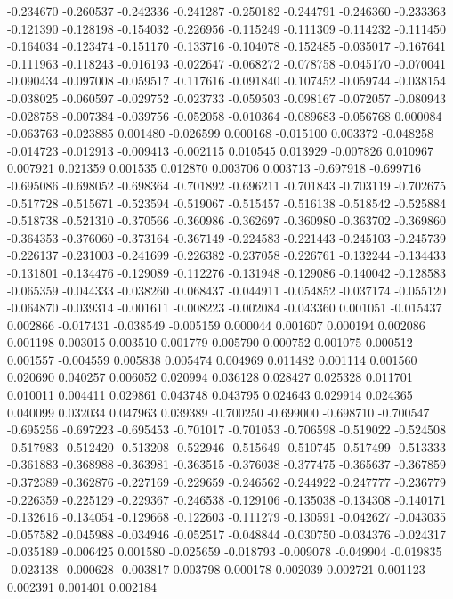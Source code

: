 -0.234670
-0.260537
-0.242336
-0.241287
-0.250182
-0.244791
-0.246360
-0.233363
-0.121390
-0.128198
-0.154032
-0.226956
-0.115249
-0.111309
-0.114232
-0.111450
-0.164034
-0.123474
-0.151170
-0.133716
-0.104078
-0.152485
-0.035017
-0.167641
-0.111963
-0.118243
-0.016193
-0.022647
-0.068272
-0.078758
-0.045170
-0.070041
-0.090434
-0.097008
-0.059517
-0.117616
-0.091840
-0.107452
-0.059744
-0.038154
-0.038025
-0.060597
-0.029752
-0.023733
-0.059503
-0.098167
-0.072057
-0.080943
-0.028758
-0.007384
-0.039756
-0.052058
-0.010364
-0.089683
-0.056768
0.000084
-0.063763
-0.023885
0.001480
-0.026599
0.000168
-0.015100
0.003372
-0.048258
-0.014723
-0.012913
-0.009413
-0.002115
0.010545
0.013929
-0.007826
0.010967
0.007921
0.021359
0.001535
0.012870
0.003706
0.003713
-0.697918
-0.699716
-0.695086
-0.698052
-0.698364
-0.701892
-0.696211
-0.701843
-0.703119
-0.702675
-0.517728
-0.515671
-0.523594
-0.519067
-0.515457
-0.516138
-0.518542
-0.525884
-0.518738
-0.521310
-0.370566
-0.360986
-0.362697
-0.360980
-0.363702
-0.369860
-0.364353
-0.376060
-0.373164
-0.367149
-0.224583
-0.221443
-0.245103
-0.245739
-0.226137
-0.231003
-0.241699
-0.226382
-0.237058
-0.226761
-0.132244
-0.134433
-0.131801
-0.134476
-0.129089
-0.112276
-0.131948
-0.129086
-0.140042
-0.128583
-0.065359
-0.044333
-0.038260
-0.068437
-0.044911
-0.054852
-0.037174
-0.055120
-0.064870
-0.039314
-0.001611
-0.008223
-0.002084
-0.043360
0.001051
-0.015437
0.002866
-0.017431
-0.038549
-0.005159
0.000044
0.001607
0.000194
0.002086
0.001198
0.003015
0.003510
0.001779
0.005790
0.000752
0.001075
0.000512
0.001557
-0.004559
0.005838
0.005474
0.004969
0.011482
0.001114
0.001560
0.020690
0.040257
0.006052
0.020994
0.036128
0.028427
0.025328
0.011701
0.010011
0.004411
0.029861
0.043748
0.043795
0.024643
0.029914
0.024365
0.040099
0.032034
0.047963
0.039389
-0.700250
-0.699000
-0.698710
-0.700547
-0.695256
-0.697223
-0.695453
-0.701017
-0.701053
-0.706598
-0.519022
-0.524508
-0.517983
-0.512420
-0.513208
-0.522946
-0.515649
-0.510745
-0.517499
-0.513333
-0.361883
-0.368988
-0.363981
-0.363515
-0.376038
-0.377475
-0.365637
-0.367859
-0.372389
-0.362876
-0.227169
-0.229659
-0.246562
-0.244922
-0.247777
-0.236779
-0.226359
-0.225129
-0.229367
-0.246538
-0.129106
-0.135038
-0.134308
-0.140171
-0.132616
-0.134054
-0.129668
-0.122603
-0.111279
-0.130591
-0.042627
-0.043035
-0.057582
-0.045988
-0.034946
-0.052517
-0.048844
-0.030750
-0.034376
-0.024317
-0.035189
-0.006425
0.001580
-0.025659
-0.018793
-0.009078
-0.049904
-0.019835
-0.023138
-0.000628
-0.003817
0.003798
0.000178
0.002039
0.002721
0.001123
0.002391
0.001401
0.002184
